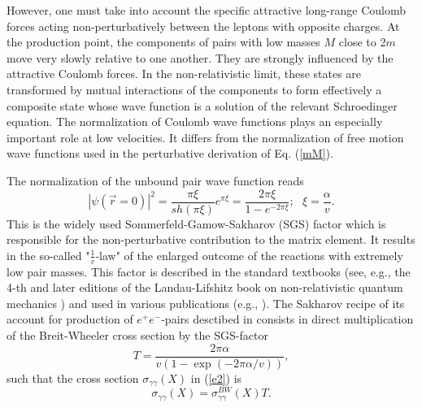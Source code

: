 \documentclass[12pt]{article}
\begin{document}
However, one must take into account the specific attractive long-range Coulomb 
forces acting non-perturbatively between the leptons with opposite charges. 
At the production point, the components of pairs with low masses $M$ close 
to 2$m$ move very slowly relative to one another. They are strongly influenced 
by the attractive Coulomb forces. In the non-relativistic limit, these states 
are transformed by mutual interactions of the components to form effectively 
a composite state whose wave function is a solution of the relevant
Schroedinger equation. The normalization of Coulomb wave functions plays an
especially important role at low velocities. It differs from the normalization
of free motion wave functions used in the perturbative derivation of
Eq. (\ref{mM}). 

The normalization of the unbound pair wave function reads \cite{llqm}
\begin{equation}
|\psi (\vec r=0)|^2 =\frac{\pi\xi}{sh(\pi\xi)}e^{\pi\xi}
=\frac{2\pi\xi}{1-e^{-2\pi\xi}};~~~\xi=\frac {\alpha }{v}.
\label{psi}
\end{equation}
This is the widely used Sommerfeld-Gamow-Sakharov (SGS) factor 
\cite{som, gam, somm, sakh} which is responsible for the non-perturbative 
contribution to the matrix element. It results in the so-called 
"$\frac {1}{v}$-law" of the enlarged outcome of the reactions with extremely 
low pair masses. This factor is described in the standard
textbooks (see, e.g., the 4-th and later editions of the Landau-Lifshitz book
on non-relativistic quantum mechanics \cite{llqm})
and used in various publications (e.g., \cite{baier, ieng, cass, arko}). 
The Sakharov recipe of its account for production of $e^+e^-$-pairs desctibed 
in \cite{sakh} consists in direct multiplication of the Breit-Wheeler 
cross section by the SGS-factor 
\begin{equation}
T=\frac {2\pi \alpha}{v(1-\exp (-2\pi \alpha/v))},
\label{sgs}
\end{equation}
such that the cross section $\sigma _{\gamma \gamma }(X)$ in (\ref{e2}) is
\begin{equation}
\sigma _{\gamma \gamma }(X)=\sigma ^{BW}_{\gamma \gamma }(X)T.
\label{crs}
\end{equation}
\end{document}
